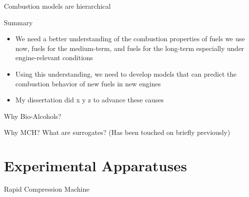 \documentclass{beamer}
\begin{document}
\begin{frame}{Combustion models are hierarchical}
{    }
\end{frame}

\begin{frame}{Summary}
    \begin{itemize}
        \item We need a better understanding of the combustion properties of fuels we use now, fuels for the medium-term, and fuels for the long-term especially under engine-relevant conditions
        \item Using this understanding, we need to develop models that can predict the combustion behavior of new fuels in new engines
        \item My dissertation did x y z to advance these causes
    \end{itemize}
\end{frame}

\begin{frame}{Why Bio-Alcohols?}
\end{frame}

\begin{frame}{Why MCH?}
What are surrogates? (Has been touched on briefly previously)
\end{frame}

\section{Experimental Apparatuses}

\begin{frame}{Rapid Compression Machine}
\end{frame}
\end{document}
